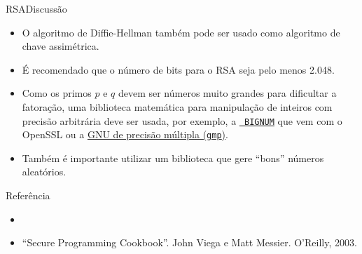 \begin{frame}{RSA}{Discussão}\footnotesize

  \begin{itemize}[<+->]
  \item O algoritmo de \alert{Diffie-Hellman} também pode ser usado como 
    algoritmo de chave assimétrica.
  \item É recomendado que o número de bits para o RSA seja pelo menos 2.048.
  \item Como os primos $p$ e $q$ devem ser números muito grandes para
    dificultar a fatoração, uma biblioteca matemática para manipulação
    de inteiros com precisão arbitrária deve ser usada, por exemplo, a
    \href{https://wiki.openssl.org/index.php/Manual:Bn_internal(3)}{\tt
      BIGNUM} que vem com o OpenSSL ou a
    \href{https://gmplib.org/}{GNU de precisão múltipla ({\tt gmp})}.

\item Também é importante utilizar um biblioteca que gere ``bons'' 
  números aleatórios.
  \end{itemize}

\end{frame}

\begin{frame}{Referência}

\begin{itemize}
\item \biblioref

\item ``Secure Programming Cookbook''. John Viega e Matt
  Messier. O'Reilly, 2003.

\end{itemize}

\end{frame}
\fi